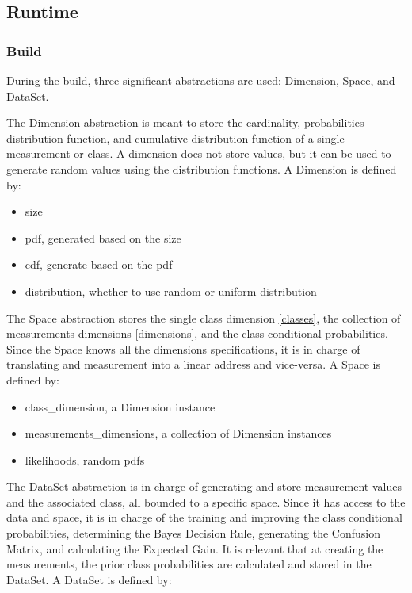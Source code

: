 \documentclass[letterpaper, conference]{IEEEtran}
\begin{document}
\subsection{Runtime}

\subsubsection{Build}

During the build, three significant abstractions are used: Dimension, Space, and DataSet.

The Dimension abstraction is meant to store the cardinality, probabilities distribution function, and cumulative distribution function of a single measurement or class. A dimension does not store values, but it can be used to generate random values using the distribution functions. A Dimension is defined by:

\begin{itemize}
  \item size
  \item pdf, generated based on the size
  \item cdf, generate based on the pdf
  \item distribution, whether to use random or uniform distribution
\end{itemize}

The Space abstraction stores the single class dimension \ref{classes}, the collection of measurements dimensions \ref{dimensions}, and the class conditional probabilities. Since the Space knows all the dimensions specifications, it is in charge of translating and measurement into a linear address and vice-versa. A Space is defined by:

\begin{itemize}
\item class\_dimension, a Dimension instance
\item measurements\_dimensions, a collection of Dimension instances
\item likelihoods, random pdfs
\end{itemize}

The DataSet abstraction is in charge of generating and store measurement values and the associated class, all bounded to a specific space. Since it has access to the data and space, it is in charge of the training and improving the class conditional probabilities, determining the Bayes Decision Rule, generating the Confusion Matrix, and calculating the Expected Gain. It is relevant that at creating the measurements, the prior class probabilities are calculated and stored in the DataSet. A DataSet is defined by:
    
\end{document}

